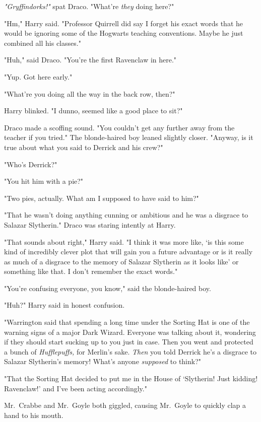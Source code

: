 \emph{"Gryffindorks!"} spat Draco. "What're \emph{they} doing here?"

"Hm," Harry said. "Professor Quirrell did say{\el} I forget his exact
words{\el} that he would be ignoring some of the Hogwarts teaching
conventions. Maybe he just combined all his classes."

"Huh," said Draco. "You're the first Ravenclaw in here."

"Yup. Got here early."

"What're you doing all the way in the back row, then?"

Harry blinked. "I dunno, seemed like a good place to sit?"

Draco made a scoffing sound. "You couldn't get any further away from the
teacher if you tried." The blonde-haired boy leaned slightly closer. "Anyway,
is it true about what you said to Derrick and his crew?"

"Who's Derrick?"

"You hit him with a pie?"

"Two pies, actually. What am I supposed to have said to him?"

"That he wasn't doing anything cunning or ambitious and he was a disgrace to
Salazar Slytherin." Draco was staring intently at Harry.

"That{\el} sounds about right," Harry said. "I think it was more like, `is
this some kind of incredibly clever plot that will gain you a future advantage
or is it really as much of a disgrace to the memory of Salazar Slytherin as it
looks like' or something like that. I don't remember the exact words."

"You're confusing everyone, you know," said the blonde-haired boy.

"Huh?" Harry said in honest confusion.

"Warrington said that spending a long time under the Sorting Hat is one of the
warning signs of a major Dark Wizard. Everyone was talking about it, wondering
if they should start sucking up to you just in case. Then you went and
protected a bunch of \emph{Hufflepuffs,} for Merlin's sake. \emph{Then} you
told Derrick he's a disgrace to Salazar Slytherin's memory! What's anyone
\emph{supposed} to think?"

"That the Sorting Hat decided to put me in the House of `Slytherin! Just
kidding! Ravenclaw!' and I've been acting accordingly."

Mr.~Crabbe and Mr.~Goyle both giggled, causing Mr.~Goyle to quickly clap a hand
to his mouth.

